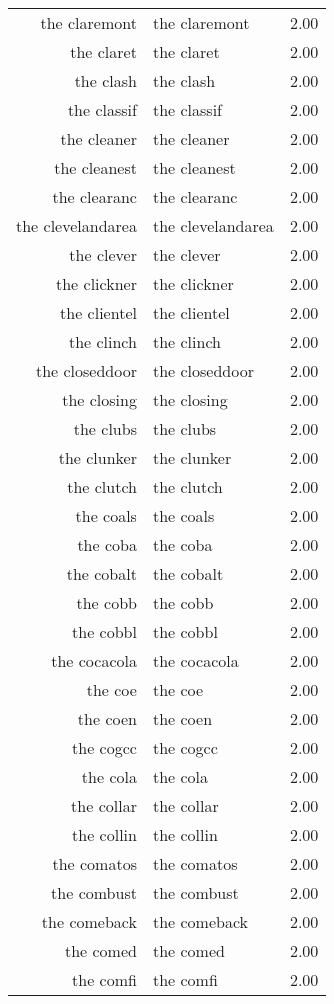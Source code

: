 \begin{table}[ht]
\begin{tabular}{rlr}
  the claremont & the claremont & 2.00 \\ 
  the claret & the claret & 2.00 \\ 
  the clash & the clash & 2.00 \\ 
  the classif & the classif & 2.00 \\ 
  the cleaner & the cleaner & 2.00 \\ 
  the cleanest & the cleanest & 2.00 \\ 
  the clearanc & the clearanc & 2.00 \\ 
  the clevelandarea & the clevelandarea & 2.00 \\ 
  the clever & the clever & 2.00 \\ 
  the clickner & the clickner & 2.00 \\ 
  the clientel & the clientel & 2.00 \\ 
  the clinch & the clinch & 2.00 \\ 
  the closeddoor & the closeddoor & 2.00 \\ 
  the closing & the closing & 2.00 \\ 
  the clubs & the clubs & 2.00 \\ 
  the clunker & the clunker & 2.00 \\ 
  the clutch & the clutch & 2.00 \\ 
  the coals & the coals & 2.00 \\ 
  the coba & the coba & 2.00 \\ 
  the cobalt & the cobalt & 2.00 \\ 
  the cobb & the cobb & 2.00 \\ 
  the cobbl & the cobbl & 2.00 \\ 
  the cocacola & the cocacola & 2.00 \\ 
  the coe & the coe & 2.00 \\ 
  the coen & the coen & 2.00 \\ 
  the cogcc & the cogcc & 2.00 \\ 
  the cola & the cola & 2.00 \\ 
  the collar & the collar & 2.00 \\ 
  the collin & the collin & 2.00 \\ 
  the comatos & the comatos & 2.00 \\ 
  the combust & the combust & 2.00 \\ 
  the comeback & the comeback & 2.00 \\ 
  the comed & the comed & 2.00 \\ 
  the comfi & the comfi & 2.00 \\ 

\end{tabular}
\end{table}
